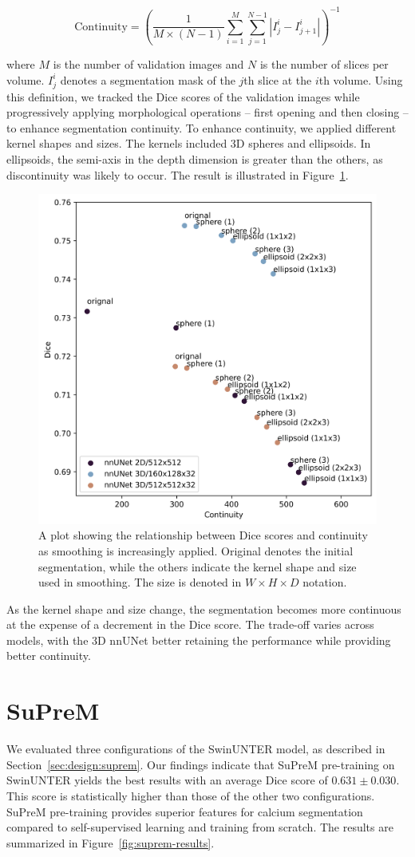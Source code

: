 \documentclass[a4paper,11pt,oneside]{report}
\begin{document}
\begin{equation}
\text{Continuity} = \left(\frac{1}{M\times (N - 1)}\sum_{i = 1}^{M}\sum_{j = 1}^{N-1} \left| I_{j}^{i} - I_{j+1}^{i}\right|\right)^{-1}
\end{equation}

where $M$ is the number of validation images and $N$ is the number of slices per volume. $I_{j}^{i}$ denotes a segmentation mask of the $j$th slice at the $i$th volume. Using this definition, we tracked the Dice scores of the validation images while progressively applying morphological operations -- first opening and then closing -- to enhance segmentation continuity. To enhance continuity, we applied different kernel shapes and sizes. The kernels included 3D spheres and ellipsoids. In ellipsoids, the semi-axis in the depth dimension is greater than the others, as discontinuity was likely to occur. The result is illustrated in Figure~\ref{fig:nnunet-continuity-vs-correctness}.

\begin{figure}[htb]
    \centering
    \includegraphics[width=0.5\linewidth]{figures/result_nnunet_dice_and_continuity.png}
    \caption{A plot showing the relationship between Dice scores and continuity as smoothing is increasingly applied. Original denotes the initial segmentation, while the others indicate the kernel shape and size used in smoothing. The size is denoted in $W\times H\times D$ notation.}
    \label{fig:nnunet-continuity-vs-correctness}
\end{figure}

As the kernel shape and size change, the segmentation becomes more continuous at the expense of a decrement in the Dice score. The trade-off varies across models, with the 3D nnUNet better retaining the performance while providing better continuity. 

\section{SuPreM}
We evaluated three configurations of the SwinUNTER model, as described in Section~\ref{sec:design:suprem}. Our findings indicate that SuPreM pre-training on SwinUNTER yields the best results with an average Dice score of $0.631\pm0.030$. This score is statistically higher than those of the other two configurations. SuPreM pre-training provides superior features for calcium segmentation compared to self-supervised learning and training from scratch. The results are summarized in Figure~\ref{fig:suprem-results}.
\end{document}
